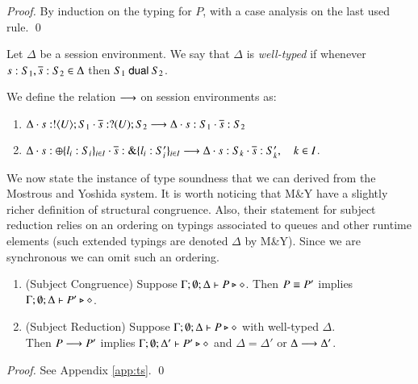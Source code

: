 \begin{proof}
By induction on the typing for $P$, with a case analysis on the last used rule. 
\qed
\end{proof}

\begin{definition}%
	Let $\Delta$ be a session environment.
	We say that $\Delta$ is {\em well-typed} if whenever
	$s: S_1, \overline{s}: S_2 \in \Delta$ then $S_1 \ \mathsf{dual}\  S_2$.
\end{definition}

\begin{definition}%
	We define the relation $\longrightarrow$ on session environments as:
	\begin{enumerate}[$-$]
		\item	$\Delta \cdot s: ! \langle U \rangle ; S_1 \cdot \overline{s}: ? (U) ; S_2 \longrightarrow \Delta \cdot s: S_1 \cdot \overline{s}: S_2$
		\item	$\Delta \cdot s: \oplus \{l_i: S_i\}_{i \in I} \cdot \overline{s}: \& \{l_i: S_i'\}_{i \in I} \longrightarrow \Delta \cdot s: S_k \cdot \overline{s}: S_k', \quad k \in I$.
	\end{enumerate}
\end{definition}

We now state the instance of type soundness that we can derived from the Mostrous and Yoshida system.
It is worth noticing that M\&Y have a slightly richer definition of structural congruence.
Also, their statement for subject reduction relies on an ordering on typings associated to queues and other 
runtime elements (such extended typings are denoted $\Delta$ by M\&Y).
Since we are synchronous we can omit such an ordering.

\begin{theorem}\label{t:sr}%
	\begin{enumerate}[1.]
		\item	(Subject Congruence) Suppose $\Gamma; \emptyset; \Delta \vdash P \triangleright \diamond$.
			Then $P \equiv P'$ implies $\Gamma; \emptyset; \Delta \vdash P' \triangleright \diamond$.

		\item	(Subject Reduction) Suppose $\Gamma; \emptyset; \Delta \vdash P \triangleright \diamond$
			with
			well-typed $\Delta$. \\
			Then $P \longrightarrow P'$ implies $\Gamma; \emptyset; \Delta'  \vdash P' \triangleright \diamond$
			and $\Delta = \Delta'$ or $\Delta \longrightarrow \Delta'$.
	\end{enumerate}
\end{theorem}

\begin{proof}
	See Appendix \ref{app:ts}.
	\qed
\end{proof}
